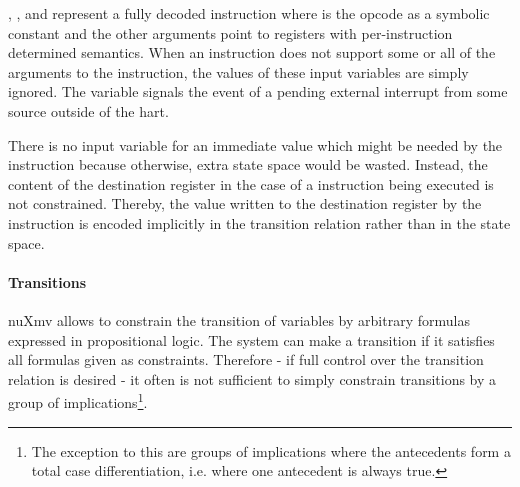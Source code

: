 , ,  and  represent a fully decoded instruction where  is the opcode as a symbolic constant and the other arguments point to registers with per-instruction determined semantics.
When an instruction does not support some or all of the arguments to the instruction, the values of these input variables are simply ignored.
The variable  signals the event of a pending external interrupt from some source outside of the \gls{hart}.

There is no input variable for an immediate value which might be needed by the  instruction because otherwise, extra state space would be wasted.
Instead, the content of the destination register in the case of a  instruction being executed is not constrained.
Thereby, the value written to the destination register by the  instruction is encoded implicitly in the transition relation rather than in the state space.

\paragraph{Transitions}
nuXmv allows to constrain the transition of variables by arbitrary formulas expressed in propositional logic.
The system can make a transition if it satisfies all formulas given as constraints.
Therefore - if full control over the transition relation is desired - it often is not sufficient to simply constrain transitions by a group of implications\footnote{%
    The exception to this are groups of implications where the antecedents form a total case differentiation, i.e. where one antecedent is always true.
}.

